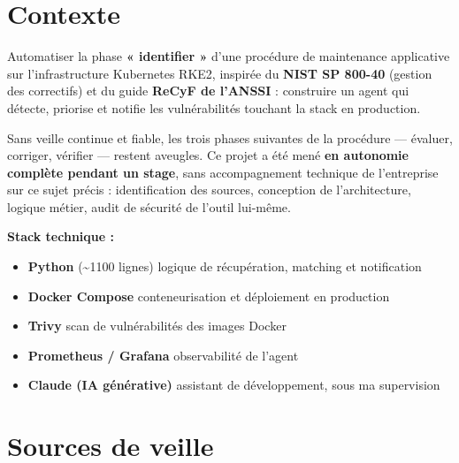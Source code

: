 \documentclass[11pt,a4paper]{article}
\begin{document}
\setcounter{page}{1}

{\sffamily
\hypersetup{linkcolor=primary}
\renewcommand{\contentsname}{\textcolor{accent}{\faList~} Sommaire}
\tableofcontents
}
\vspace{0.4cm}

\section{Contexte}

\begin{infobox}[title={\faSatelliteDish~Mission}]
Automatiser la phase \textbf{« identifier »} d'une procédure de maintenance applicative sur l'infrastructure Kubernetes RKE2, inspirée du \textbf{NIST SP 800-40} (gestion des correctifs) et du guide \textbf{ReCyF de l'ANSSI} : construire un agent qui détecte, priorise et notifie les vulnérabilités touchant la stack en production.
\end{infobox}

Sans veille continue et fiable, les trois phases suivantes de la procédure — évaluer, corriger, vérifier — restent aveugles. Ce projet a été mené \textbf{en autonomie complète pendant un stage}, sans accompagnement technique de l'entreprise sur ce sujet précis : identification des sources, conception de l'architecture, logique métier, audit de sécurité de l'outil lui-même.

\medskip
\noindent\textbf{Stack technique :}
\begin{itemize}
  \item \textbf{Python} (\hbox{\textasciitilde}1100 lignes) \textemdash{} logique de récupération, matching et notification
  \item \textbf{Docker Compose} \textemdash{} conteneurisation et déploiement en production
  \item \textbf{Trivy} \textemdash{} scan de vulnérabilités des images Docker
  \item \textbf{Prometheus / Grafana} \textemdash{} observabilité de l'agent
  \item \textbf{Claude (IA générative)} \textemdash{} assistant de développement, sous ma supervision
\end{itemize}

\section{Sources de veille}
\end{document}
